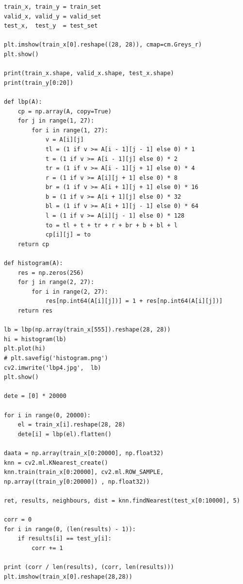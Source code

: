 \documentclass{article}
\begin{document}
\begin{verbatim}
train_x, train_y = train_set
valid_x, valid_y = valid_set
test_x,  test_y  = test_set

plt.imshow(train_x[0].reshape((28, 28)), cmap=cm.Greys_r)
plt.show()

print(train_x.shape, valid_x.shape, test_x.shape)
print(train_y[0:20])

def lbp(A):
    cp = np.array(A, copy=True)
    for j in range(1, 27):
        for i in range(1, 27):
            v = A[i][j]
            tl = (1 if v >= A[i - 1][j - 1] else 0) * 1
            t = (1 if v >= A[i - 1][j] else 0) * 2
            tr = (1 if v >= A[i - 1][j + 1] else 0) * 4
            r = (1 if v >= A[i][j + 1] else 0) * 8
            br = (1 if v >= A[i + 1][j + 1] else 0) * 16
            b = (1 if v >= A[i + 1][j] else 0) * 32
            bl = (1 if v >= A[i + 1][j - 1] else 0) * 64
            l = (1 if v >= A[i][j - 1] else 0) * 128
            to = tl + t + tr + r + br + b + bl + l
            cp[i][j] = to
    return cp

def histogram(A):
    res = np.zeros(256)
    for j in range(2, 27):
        for i in range(2, 27):
            res[np.int64(A[i][j])] = 1 + res[np.int64(A[i][j])]
    return res

lb = lbp(np.array(train_x[555]).reshape(28, 28))
hi = histogram(lb)
plt.plot(hi)
# plt.savefig('histogram.png')
cv2.imwrite('lbp4.jpg',  lb)
plt.show()

dete = [0] * 20000

for i in range(0, 20000):
    el = train_x[i].reshape(28, 28)
    dete[i] = lbp(el).flatten()

daata = np.array(train_x[0:20000], np.float32)
knn = cv2.ml.KNearest_create()
knn.train(train_x[0:20000], cv2.ml.ROW_SAMPLE, np.array((train_y[0:20000]) , np.float32))

ret, results, neighbours, dist = knn.findNearest(test_x[0:10000], 5)

corr = 0
for i in range(0, (len(results) - 1)):
    if results[i] == test_y[i]:
        corr += 1
        
print (corr / len(results), (corr, len(results)))
plt.imshow(train_x[0].reshape(28,28))

\end{verbatim}
\newpage
\end{document}
